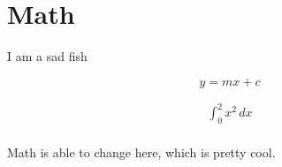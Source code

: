 \section{Math}
I am a sad fish

\begin{equation}
	y = mx + c
\end{equation}

\begin{gather}
	\int_{0}^{2} x^2 \,dx \\
\end{gather}

Math is able to change here, which is pretty cool.